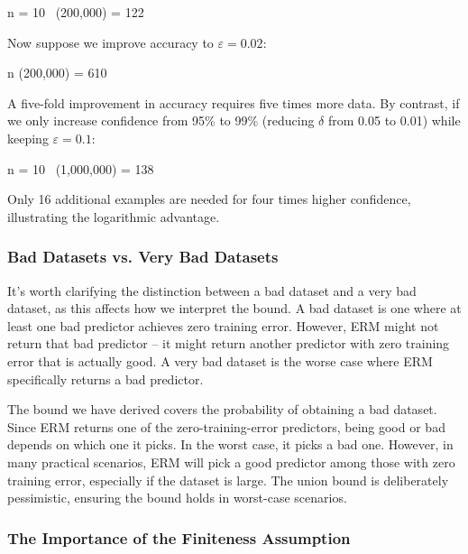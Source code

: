 \begin{myequation}
n \ge {}\ln{} = 10 \, \ln(200,000)   = 122 
\end{myequation}

Now suppose we improve accuracy to $\varepsilon = 0.02$:

\begin{myequation}
n \ge {}\ln(200,000)   = 610 
\end{myequation}

A five-fold improvement in accuracy requires five times more data. By contrast, if we only increase confidence from 95\% to 99\% (reducing $\delta$ from 0.05 to 0.01) while keeping $\varepsilon = 0.1$:

\begin{myequation}
n \ge {}\ln{} = 10 \, \ln(1,000,000)   = 138 
\end{myequation}

Only 16 additional examples are needed for four times higher confidence, illustrating the logarithmic advantage.

\subsubsection*{Bad Datasets vs. Very Bad Datasets}

It's worth clarifying the distinction between a bad dataset and a very bad dataset, as this affects how we interpret the bound. A bad dataset is one where at least one bad predictor achieves zero training error. However, ERM might not return that bad predictor  --  it might return another predictor with zero training error that is actually good. A very bad dataset is the worse case where ERM specifically returns a bad predictor.

The bound we have derived covers the probability of obtaining a bad dataset. Since ERM returns one of the zero-training-error predictors, being good or bad depends on which one it picks. In the worst case, it picks a bad one. However, in many practical scenarios, ERM will pick a good predictor among those with zero training error, especially if the dataset is large. The union bound is deliberately pessimistic, ensuring the bound holds in worst-case scenarios.

\subsubsection*{The Importance of the Finiteness Assumption}

